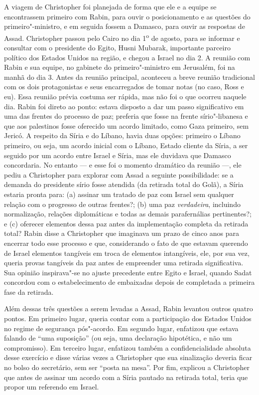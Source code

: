A viagem de Christopher foi planejada de forma que ele e a equipe se
encontrassem primeiro com Rabin, para ouvir o posicionamento e as
questões do primeiro"-ministro, e em seguida fossem a Damasco, para ouvir
as respostas de Assad. Christopher passou pelo Cairo no dia 1\textsuperscript{o} de
agosto, para se informar e consultar com o presidente do Egito, Husni
Mubarak, importante parceiro político dos Estados Unidos na região, e
chegou a Israel no dia 2. A reunião com Rabin e sua equipe, no gabinete
do primeiro"-ministro em Jerusalém, foi na manhã do dia 3. Antes da
reunião principal, aconteceu a breve reunião tradicional com os dois
protagonistas e seus encarregados de tomar notas (no caso, Ross e eu).
Essa reunião prévia costuma ser rápida, mas não foi o que ocorreu
naquele dia. Rabin foi direto ao ponto: estava disposto a dar um passo
significativo em uma das frentes do processo de paz; preferia que fosse
na frente sírio"-libanesa e que aos palestinos fosse oferecido um acordo
limitado, como Gaza primeiro, sem Jericó. A respeito da Síria e do
Líbano, havia duas opções: primeiro o Líbano primeiro, ou seja, um
acordo inicial com o Líbano, Estado cliente da Síria, a ser seguido por
um acordo entre Israel e Síria, mas ele duvidava que Damasco
concordaria. No entanto --- e esse foi o momento dramático da reunião ---,
ele pediu a Christopher para explorar com Assad a seguinte possibilidade:
se a demanda do presidente sírio fosse atendida (da retirada total do
Golã), a Síria estaria pronta para: (a) assinar um tratado de paz com
Israel sem qualquer relação com o progresso de outras frentes?; (b) uma
paz \textit{verdadeira}, incluindo normalização, relações diplomáticas e
todas as demais parafernálias pertinentes?; e (c) oferecer elementos
dessa paz antes da implementação completa da retirada total? Rabin disse
a Christopher que imaginava um prazo de cinco anos para encerrar todo
esse processo e que, considerando o fato de que estavam querendo de
Israel elementos tangíveis em troca de elementos intangíveis, ele, por
sua vez, queria provas tangíveis da paz antes de empreender uma retirada
significativa. Sua opinião inspirava"-se no ajuste precedente entre Egito
e Israel, quando Sadat concordou com o estabelecimento de embaixadas
depois de completada a primeira fase da retirada.

Além dessas três questões a serem levadas a Assad, Rabin levantou outros
quatro pontos. Em primeiro lugar, queria contar com a participação dos
Estados Unidos no regime de segurança pós"-acordo. Em segundo lugar,
enfatizou que estava falando de ``uma suposição'' (ou seja, uma
declaração hipotética, e não um compromisso). Em terceiro lugar,
enfatizou também a confidencialidade absoluta desse exercício e disse
várias vezes a Christopher que sua sinalização deveria ficar no bolso do
secretário, sem ser ``posta na mesa''. Por fim, explicou a Christopher
que antes de assinar um acordo com a Síria pautado na retirada total,
teria que propor um referendo em Israel.

